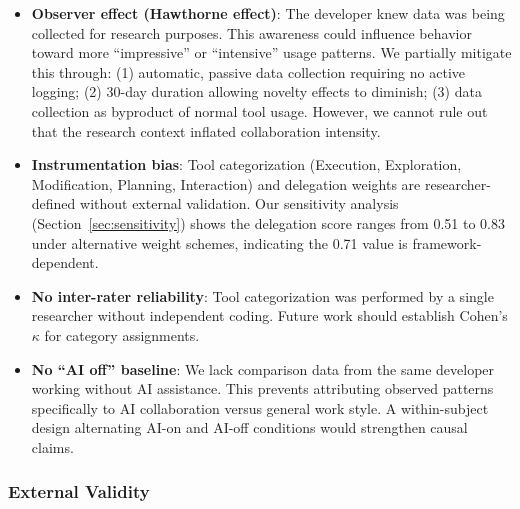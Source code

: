 \documentclass{ntlabs-preprint}
\begin{document}
\begin{itemize}
    \item \textbf{Observer effect (Hawthorne effect)}: The developer knew data was being collected for research purposes. This awareness could influence behavior toward more ``impressive'' or ``intensive'' usage patterns. We partially mitigate this through: (1) automatic, passive data collection requiring no active logging; (2) 30-day duration allowing novelty effects to diminish; (3) data collection as byproduct of normal tool usage. However, we cannot rule out that the research context inflated collaboration intensity.

    \item \textbf{Instrumentation bias}: Tool categorization (Execution, Exploration, Modification, Planning, Interaction) and delegation weights are researcher-defined without external validation. Our sensitivity analysis (Section~\ref{sec:sensitivity}) shows the delegation score ranges from 0.51 to 0.83 under alternative weight schemes, indicating the 0.71 value is framework-dependent.

    \item \textbf{No inter-rater reliability}: Tool categorization was performed by a single researcher without independent coding. Future work should establish Cohen's $\kappa$ for category assignments.

    \item \textbf{No ``AI off'' baseline}: We lack comparison data from the same developer working without AI assistance. This prevents attributing observed patterns specifically to AI collaboration versus general work style. A within-subject design alternating AI-on and AI-off conditions would strengthen causal claims.
\end{itemize}

\subsubsection{External Validity}
\end{document}
